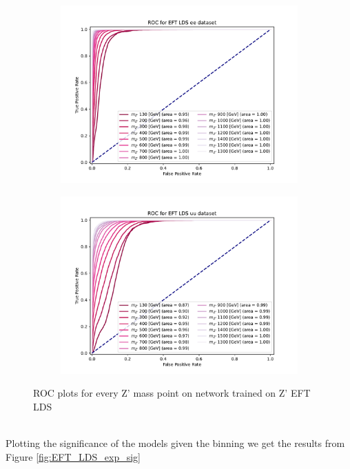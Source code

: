 \documentclass[14pt, a4paper]{book}
\begin{document}
\begin{figure}[!ht]
	\centering
	\begin{subfigure}[b]{0.49\textwidth}
      \centering
      \includegraphics[width=1\textwidth]{XGBoost/EFT_LDS/ROC_ee.pdf}
      \end{subfigure}
   \hfill
   \begin{subfigure}[b]{0.49\textwidth}
      \centering
      \includegraphics[width=1\textwidth]{XGBoost/EFT_LDS/ROC_uu.pdf}
      \end{subfigure}
   \caption{ROC plots for every Z' mass point on network trained on Z' EFT LDS}\label{fig:EFT_LDS_ROCS}
\end{figure}
\\Plotting the significance of the models given the binning we get the results from Figure \ref{fig:EFT_LDS_exp_sig}
\end{document}
